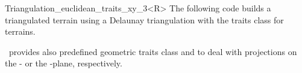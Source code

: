 \begin{ccRefClass}{Triangulation_euclidean_traits_xy_3<R>}
\ccExample
The following code builds a triangulated terrain
using a Delaunay triangulation with the traits class for 
terrains.


\cgal\ provides also predefined geometric traits class
 and
 to
deal with projections on the
 - or  the -plane,
respectively.

\\


\end{ccRefClass}


